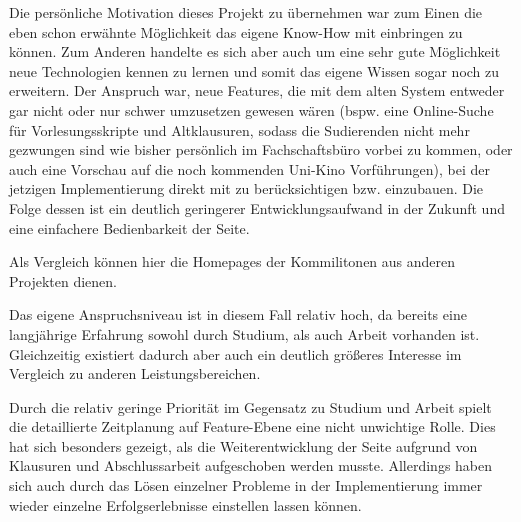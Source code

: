 Die persönliche Motivation dieses Projekt zu übernehmen war zum Einen die eben schon erwähnte Möglichkeit das eigene Know-How mit einbringen zu können. Zum Anderen handelte es sich aber auch um eine sehr gute Möglichkeit neue Technologien kennen zu lernen und somit das eigene Wissen sogar noch zu erweitern. Der Anspruch war, neue Features, die mit dem alten System entweder gar nicht oder nur schwer umzusetzen gewesen wären (bspw. eine Online-Suche für Vorlesungsskripte und Altklausuren, sodass die Sudierenden nicht mehr gezwungen sind wie bisher persönlich im Fachschaftsbüro vorbei zu kommen, oder auch eine Vorschau auf die noch kommenden Uni-Kino Vorführungen), bei der jetzigen Implementierung direkt mit zu berücksichtigen bzw. einzubauen. Die Folge dessen ist ein deutlich geringerer Entwicklungsaufwand in der Zukunft und eine einfachere Bedienbarkeit der Seite.

Als Vergleich können hier die Homepages der Kommilitonen aus anderen Projekten dienen.

Das eigene Anspruchsniveau ist in diesem Fall relativ hoch, da bereits eine langjährige Erfahrung sowohl durch Studium, als auch Arbeit vorhanden ist. Gleichzeitig existiert dadurch aber auch ein deutlich größeres Interesse im Vergleich zu anderen Leistungsbereichen.

Durch die relativ geringe Priorität im Gegensatz zu Studium und Arbeit spielt die detaillierte  Zeitplanung auf Feature-Ebene eine nicht unwichtige Rolle. Dies hat sich besonders gezeigt, als die Weiterentwicklung der Seite aufgrund von Klausuren und Abschlussarbeit aufgeschoben werden musste. Allerdings haben sich auch durch das Lösen einzelner Probleme in der Implementierung immer wieder einzelne Erfolgserlebnisse einstellen lassen können.